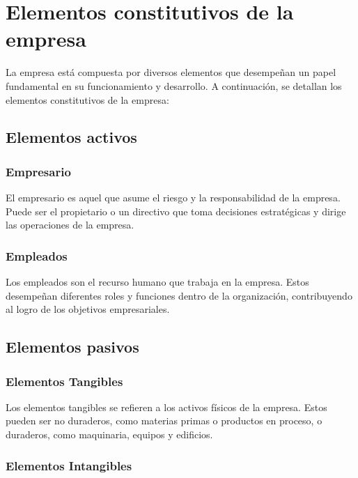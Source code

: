 \documentclass[
  man,
  floatsintext,
  longtable,
  a4paper,
  nolmodern,
  notxfonts,
  notimes,
  12pt,
  colorlinks=true,linkcolor=blue,citecolor=blue,urlcolor=blue]{apa7}
\begin{document}
\section{Elementos constitutivos de la
empresa}\label{elementos-constitutivos-de-la-empresa}

La empresa está compuesta por diversos elementos que desempeñan un papel
fundamental en su funcionamiento y desarrollo. A continuación, se
detallan los elementos constitutivos de la empresa:

\subsection{Elementos activos}\label{elementos-activos}

\subsubsection{Empresario}\label{empresario}

El empresario es aquel que asume el riesgo y la responsabilidad de la
empresa. Puede ser el propietario o un directivo que toma decisiones
estratégicas y dirige las operaciones de la empresa.

\subsubsection{Empleados}\label{empleados}

Los empleados son el recurso humano que trabaja en la empresa. Estos
desempeñan diferentes roles y funciones dentro de la organización,
contribuyendo al logro de los objetivos empresariales.

\subsection{Elementos pasivos}\label{elementos-pasivos}

\subsubsection{Elementos Tangibles}\label{elementos-tangibles}

Los elementos tangibles se refieren a los activos físicos de la empresa.
Estos pueden ser no duraderos, como materias primas o productos en
proceso, o duraderos, como maquinaria, equipos y edificios.

\subsubsection{Elementos Intangibles}\label{elementos-intangibles}
\end{document}
